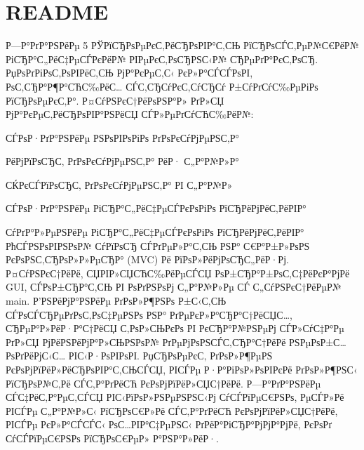 \chapter{README}
\hypertarget{md__r_e_a_d_m_e}{}\label{md__r_e_a_d_m_e}
Р—Р°РґР°РЅРёРµ 5 РЎРїСЂРѕРµРєС‚РёСЂРѕРІР°С‚СЊ РїСЂРѕСЃС‚РµР№С€РёР№ РіСЂР°С„РёС‡РµСЃРєРёР№ РІРµРєС‚РѕСЂРЅС‹Р№ СЂРµРґР°РєС‚РѕСЂ. РџРѕРґРіРѕС‚РѕРІРёС‚СЊ РјР°РєРµС‚С‹ РєР»Р°СЃСЃРѕРІ, РѕС‚СЂР°Р¶Р°СЋС‰РёС… СЃС‚СЂСѓРєС‚СѓСЂСѓ Р±СѓРґСѓС‰РµРіРѕ РїСЂРѕРµРєС‚Р°. Р¤СѓРЅРєС†РёРѕРЅР°Р» РґР»СЏ РјР°РєРµС‚РёСЂРѕРІР°РЅРёСЏ СЃР»РµРґСѓСЋС‰РёР№\+:
\begin{DoxyItemize}
\item СЃРѕР·РґР°РЅРёРµ РЅРѕРІРѕРіРѕ РґРѕРєСѓРјРµРЅС‚Р°
\item РёРјРїРѕСЂС‚ РґРѕРєСѓРјРµРЅС‚Р° РёР· С„Р°Р№Р»Р°
\item СЌРєСЃРїРѕСЂС‚ РґРѕРєСѓРјРµРЅС‚Р° РІ С„Р°Р№Р»
\item СЃРѕР·РґР°РЅРёРµ РіСЂР°С„РёС‡РµСЃРєРѕРіРѕ РїСЂРёРјРёС‚РёРІР°
\item СѓРґР°Р»РµРЅРёРµ РіСЂР°С„РёС‡РµСЃРєРѕРіРѕ РїСЂРёРјРёС‚РёРІР° РћСЃРЅРѕРІРЅРѕР№ СѓРїРѕСЂ СЃРґРµР»Р°С‚СЊ РЅР° С€Р°Р±Р»РѕРЅ РєРѕРЅС‚СЂРѕР»Р»РµСЂР° (MVC) Рё РїРѕР»РёРјРѕСЂС„РёР·Рј. Р¤СѓРЅРєС†РёРё, СЏРІР»СЏСЋС‰РёРµСЃСЏ РѕР±СЂР°Р±РѕС‚С‡РёРєР°РјРё GUI, СЃРѕР±СЂР°С‚СЊ РІ РѕРґРЅРѕРј С„Р°Р№Р»Рµ СЃ С„СѓРЅРєС†РёРµР№ {\ttfamily main}. Р’РЅРёРјР°РЅРёРµ РґРѕР»Р¶РЅРѕ Р±С‹С‚СЊ СЃРѕСЃСЂРµРґРѕС‚РѕС‡РµРЅРѕ РЅР° РґРµРєР»Р°СЂР°С†РёСЏС…, СЂРµР°Р»РёР·Р°С†РёСЏ С‚РѕР»СЊРєРѕ РІ РєСЂР°Р№РЅРµРј СЃР»СѓС‡Р°Рµ РґР»СЏ РјРёРЅРёРјР°Р»СЊРЅРѕР№ РґРµРјРѕРЅСЃС‚СЂР°С†РёРё РЅРµРѕР±С…РѕРґРёРјС‹С… РІС‹Р·РѕРІРѕРІ. РџСЂРѕРµРєС‚ РґРѕР»Р¶РµРЅ РєРѕРјРїРёР»РёСЂРѕРІР°С‚СЊСЃСЏ, РІСЃРµ Р·Р°РіРѕР»РѕРІРєРё РґРѕР»Р¶РЅС‹ РїСЂРѕР№С‚Рё СЃС‚Р°РґРёСЋ РєРѕРјРїРёР»СЏС†РёРё. Р—Р°РґР°РЅРёРµ СЃС‡РёС‚Р°РµС‚СЃСЏ РІС‹РїРѕР»РЅРµРЅРЅС‹Рј СѓСЃРїРµС€РЅРѕ, РµСЃР»Рё РІСЃРµ С„Р°Р№Р»С‹ РїСЂРѕС€Р»Рё СЃС‚Р°РґРёСЋ РєРѕРјРїРёР»СЏС†РёРё, РІСЃРµ РєР»Р°СЃСЃС‹ РѕС…РІР°С‡РµРЅС‹ РґРёР°РіСЂР°РјРјР°РјРё, РєРѕРґ СѓСЃРїРµС€РЅРѕ РїСЂРѕС€РµР» Р°РЅР°Р»РёР·. 
\end{DoxyItemize}